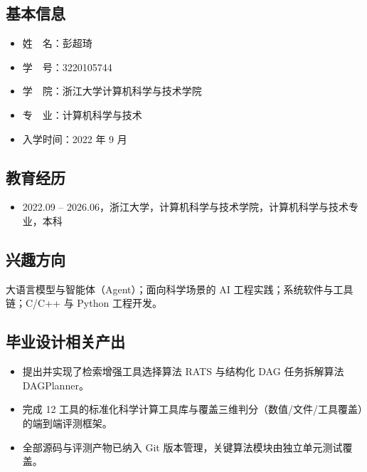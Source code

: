 \cleardoublepage
{}

\subsection*{基本信息}

\begin{itemize}
    \item 姓~~名：彭超琦
    \item 学~~号：3220105744
    \item 学~~院：浙江大学计算机科学与技术学院
    \item 专~~业：计算机科学与技术
    \item 入学时间：2022 年 9 月
\end{itemize}

\subsection*{教育经历}

\begin{itemize}
    \item 2022.09 -- 2026.06，浙江大学，计算机科学与技术学院，计算机科学与技术专业，本科
\end{itemize}

\subsection*{兴趣方向}

大语言模型与智能体（Agent）；面向科学场景的 AI 工程实践；系统软件与工具链；C/C++ 与 Python 工程开发。

\subsection*{毕业设计相关产出}

\begin{itemize}
    \item 提出并实现了检索增强工具选择算法 RATS 与结构化 DAG 任务拆解算法 DAGPlanner。
    \item 完成 12 工具的标准化科学计算工具库与覆盖三维判分（数值/文件/工具覆盖）的端到端评测框架。
    \item 全部源码与评测产物已纳入 Git 版本管理，关键算法模块由独立单元测试覆盖。
\end{itemize}
